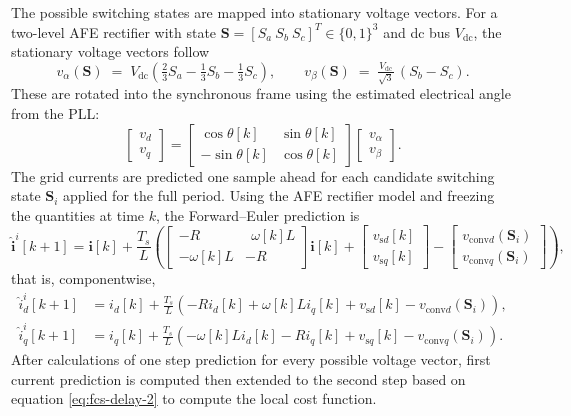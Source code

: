 The possible switching states are mapped into stationary voltage vectors. For a two-level AFE rectifier with state $\mathbf S=[S_a\ S_b\ S_c]^T\in\{0,1\}^3$ and dc bus $V_{\mathrm{dc}}$, the stationary voltage vectors follow
\begin{equation}
\label{eq:m2pc-valphabeta}
v_\alpha(\mathbf S)\;=\;V_{\mathrm{dc}}\!\left(\tfrac{2}{3}S_a-\tfrac{1}{3}S_b-\tfrac{1}{3}S_c\right),\qquad
v_\beta(\mathbf S)\;=\;\tfrac{V_{\mathrm{dc}}}{\sqrt{3}}\,(S_b-S_c).
\end{equation}
These are rotated into the synchronous frame using the estimated electrical angle from the PLL:
\begin{equation}
\label{eq:m2pc-vdq}
\begin{bmatrix} v_d \\[2pt] v_q \end{bmatrix}
=
\begin{bmatrix}
\cos\theta[k] & \sin\theta[k]\\[2pt]
-\sin\theta[k] & \cos\theta[k]
\end{bmatrix}
\begin{bmatrix} v_\alpha \\[2pt] v_\beta \end{bmatrix}.
\end{equation}
The grid currents are predicted one sample ahead for each candidate switching state $\mathbf S_i$ applied for the full period. Using the AFE rectifier model and freezing the quantities at time $k$, the Forward–Euler prediction is
\begin{equation}
\label{eq:m2pc-fe-vector}
\hat{\mathbf i}^{i}[k{+}1]
=
\mathbf i[k]
+\frac{T_s}{L}\left(
\begin{bmatrix}
- R & \ \ \omega[k] L\\[2pt]
- \omega[k] L & - R
\end{bmatrix}\mathbf i[k]
+
\begin{bmatrix} v_{\mathrm{s}d}[k] \\[2pt] v_{\mathrm{s}q}[k] \end{bmatrix}
-
\begin{bmatrix} v_{\mathrm{conv}d}(\mathbf S_i) \\[2pt] v_{\mathrm{conv}q}(\mathbf S_i) \end{bmatrix}
\right),
\end{equation}
that is, componentwise,
\begin{align}
\label{eq:m2pc-fe-id}
\hat i_d^{i}[k{+}1] &= i_d[k] + \frac{T_s}{L}\left(-R i_d[k] + \omega[k]L i_q[k] + v_{\mathrm{s}d}[k] - v_{\mathrm{conv}d}(\mathbf S_i)\right),\\
\label{eq:m2pc-fe-iq}
\hat i_q^{i}[k{+}1] &= i_q[k] + \frac{T_s}{L}\left(-\omega[k]L i_d[k] - R i_q[k] + v_{\mathrm{s}q}[k] - v_{\mathrm{conv}q}(\mathbf S_i)\right).
\end{align}
After calculations of one step prediction for every possible voltage vector, first current prediction is computed then extended to the second step based on equation \eqref{eq:fcs-delay-2} to compute the local cost function. 

